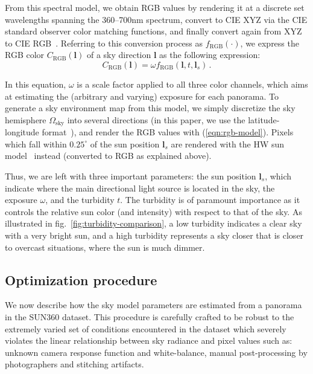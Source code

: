 From this spectral model, we obtain RGB values by rendering it at a discrete set wavelengths spanning the 360--700nm spectrum, convert to CIE XYZ via the CIE standard observer color matching functions, and finally convert again from XYZ to CIE RGB~\cite{hosek-siggraph-12}. Referring to this conversion process as $f_\text{RGB}(\cdot)$, we express the RGB color $C_\text{RGB}(\mathbf{l})$ of a sky direction $\mathbf{l}$ as the following expression:
%
\begin{equation}
C_\text{RGB}(\mathbf{l}) = \omega f_\text{RGB}(\mathbf{l}, t, \mathbf{l}_s)\,.
\label{eqn:rgb-model} 
\end{equation}
%

In this equation, $\omega$ is a scale factor applied to all three color channels, which aims at estimating the (arbitrary and varying) exposure for each panorama. To generate a sky environment map from this model, we simply discretize the sky hemisphere $\Omega_\text{sky}$ into several directions (in this paper, we use the latitude-longitude format~\cite{reinhard-book-10}), and render the RGB values with (\ref{eqn:rgb-model}). Pixels which fall within $0.25^\circ$ of the sun position $\mathbf{l}_s$ are rendered with the HW sun model~\cite{hosek-cga-13} instead (converted to RGB as explained above).

Thus, we are left with three important parameters: the sun position $\mathbf{l}_s$, which indicate where the main directional light source is located in the sky, the exposure $\omega$, and the turbidity $t$. The turbidity is of paramount importance as it controls the relative sun color (and intensity) with respect to that of the sky. As illustrated in fig.~\ref{fig:turbidity-comparison}, a low turbidity indicates a clear sky with a very bright sun, and a high turbidity represents a sky closer that is closer to overcast situations, where the sun is much dimmer. 

\subsection{Optimization procedure}
\label{sec:optimization}

We now describe how the sky model parameters are estimated from a panorama in the SUN360 dataset. This procedure is carefully crafted to be robust to the extremely varied set of conditions encountered in the dataset which severely violates the linear relationship between sky radiance and pixel values such as: unknown camera response function and white-balance, manual post-processing by photographers and stitching artifacts. 

